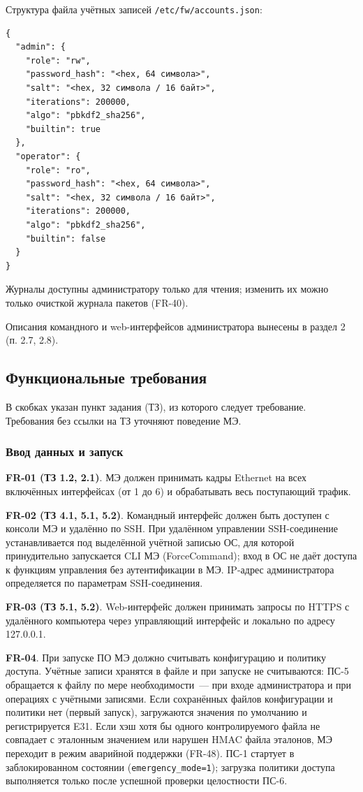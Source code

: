 \documentclass[13pt,a4paper,final]{article}
\begin{document}
	Структура файла учётных записей \texttt{/etc/fw/accounts.json}:
\begin{lstlisting}[label=lst:accounts, caption={Формат /etc/fw/accounts.json}]
{
  "admin": {
    "role": "rw",
    "password_hash": "<hex, 64 символа>",
    "salt": "<hex, 32 символа / 16 байт>",
    "iterations": 200000,
    "algo": "pbkdf2_sha256",
    "builtin": true
  },
  "operator": {
    "role": "ro",
    "password_hash": "<hex, 64 символа>",
    "salt": "<hex, 32 символа / 16 байт>",
    "iterations": 200000,
    "algo": "pbkdf2_sha256",
    "builtin": false
  }
}
\end{lstlisting}

	Журналы доступны администратору только для чтения; изменить их можно только очисткой журнала пакетов (FR-40).
	
	Описания командного и web-интерфейсов администратора вынесены в раздел 2 (п. 2.7, 2.8).
	
	\subsection{Функциональные требования}
	В скобках указан пункт задания (ТЗ), из которого следует требование. Требования без ссылки на ТЗ уточняют поведение МЭ.
	
	\subsubsection{Ввод данных и запуск}
	
	\textbf{FR-01 (ТЗ 1.2, 2.1)}. МЭ должен принимать кадры Ethernet на всех включённых интерфейсах (от 1 до 6) и обрабатывать весь поступающий трафик.
	
	\textbf{FR-02 (ТЗ 4.1, 5.1, 5.2)}. Командный интерфейс должен быть доступен с консоли МЭ и удалённо по SSH. При удалённом управлении SSH-соединение устанавливается под выделённой учётной записью ОС, для которой принудительно запускается CLI МЭ (ForceCommand); вход в ОС не даёт доступа к функциям управления без аутентификации в МЭ. IP-адрес администратора определяется по параметрам SSH-соединения.
	
	\textbf{FR-03 (ТЗ 5.1, 5.2)}. Web-интерфейс должен принимать запросы по HTTPS с удалённого компьютера через управляющий интерфейс и локально по адресу 127.0.0.1.
	
	\textbf{FR-04}. При запуске ПО МЭ должно считывать конфигурацию и политику доступа. Учётные записи хранятся в файле и при запуске не считываются: ПС-5 обращается к файлу по мере необходимости~--- при входе администратора и при операциях с учётными записями. Если сохранённых файлов {конфигурации и политики} нет (первый запуск), загружаются значения по умолчанию и регистрируется E31. Если хэш хотя бы одного контролируемого файла не совпадает с эталонным значением или нарушен HMAC файла эталонов, МЭ переходит в режим аварийной поддержки (FR-48). {ПС-1 стартует в заблокированном состоянии (\texttt{emergency\_mode=1}); загрузка политики доступа выполняется только после успешной проверки целостности ПС-6.}
\end{document}
